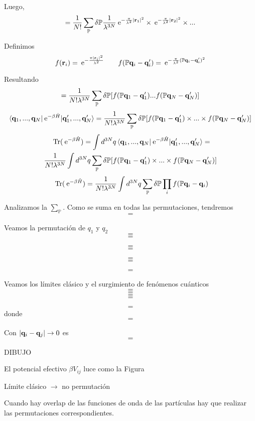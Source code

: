 \documentclass[10pt,oneside]{CBFT_book}
\begin{document}
Luego,
\[
	= \frac{1}{N!} \sum_{ \mathbb{P} } \delta\mathbb{P} \frac{1}{\lambda^{3N}}
	\euler^{ -\frac{\pi}{\lambda^2} |\vb{r}_1|^2 } \times \euler^{ -\frac{\pi}{\lambda^2} |\vb{r}_2|^2 } \times ...
\]

Definimos
\[
	f( \vb{r}_i ) = \euler^{ -\frac{ \pi |\vb{r}_i|^2 }{ \lambda^2 } } \qquad 
	f( \mathbb{P}\vb{q}_i - \vb{q}_i' ) = \euler^{ -\frac{ \pi }{ \lambda^2 }(\mathbb{P}\vb{q}_i - \vb{q}_i')^2 }
\]

Resultando 
\[
	= \frac{1}{N!\lambda^{3N}} \sum_{\mathbb{P}} \delta\mathbb{P} [ f( \mathbb{P}\vb{q}_1 - \vb{q}_1' ) ... 
	f( \mathbb{P}\vb{q}_N - \vb{q}_N' )]
\]
\[
	\braket{ \vb{q}_1,..., \vb{q}_N|\euler^{-\beta\hat{H}}| \vb{q}_1',..., \vb{q}_N' } = 
	\frac{1}{N!\lambda^{3N}} \sum_{\mathbb{P}} \delta\mathbb{P} [ f( \mathbb{P}\vb{q}_1 - \vb{q}_1' ) \times 
	... \times f( \mathbb{P}\vb{q}_N - \vb{q}_N' )]
\]
\begin{multline*}
	\text{ Tr} (\euler^{-\beta\hat{H}}) = \int d^{3N} q
	\braket{ \vb{q}_1,..., \vb{q}_N|\euler^{-\beta\hat{H}}| \vb{q}_1',..., \vb{q}_N' } =\\
	\frac{1}{N!\lambda^{3N}} \int d^{3N}q \sum_{\mathbb{P}} \delta\mathbb{P} [ f( \mathbb{P}\vb{q}_1 - \vb{q}_1' ) 
	\times ... \times f( \mathbb{P}\vb{q}_N - \vb{q}_N' )]
\end{multline*}
\[
	\text{ Tr} (\euler^{-\beta\hat{H}}) = \frac{1}{N!\lambda^{3N}} \int d^{3N}q \sum_{\mathbb{P}} 
	\delta\mathbb{P} \prod_i f( \mathbb{P}\vb{q}_i - \vb{q}_i )
\]

Analizamos la $\sum_{\mathbb{P}}$. Como se suma en todas las permutaciones, tendremos
\[
	=
\]

Veamos la permutación de $q_1$ y $q_2$
\[
	=
\]
\[
	=
\]

\[
	=
\]
\[
	=
\]

\[
	=
\]
\[
	=
\]

\[
	=
\]

Veamos los límites clásico y el surgimiento de fenómenos cuánticos 
\[
	=
\]
\[
	=
\]
\[
	=
\]
\[
	=
\]

\[
	=
\]
donde 
\[
	=
\]

Con $ | \vb{q}_i - \vb{q}_j| \to 0 $ es
\[
	=
\]

DIBUJO 

El potencial efectivo $\beta V_{ij}$ luce como la Figura


Límite clásico $\to$ no permutación 

Cuando hay overlap de las funciones de onda de las partículas hay que realizar las permutaciones correspondientes.
\end{document}
